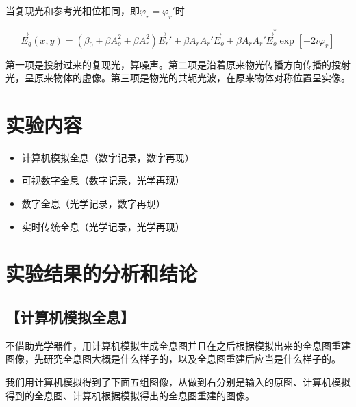 \documentclass{ctexart}
\let\oldsubsection\subsection
\renewcommand{\subsection}[1]{\oldsubsection{\!\!\!\!\!\!【#1】}}
\begin{document}
当复现光和参考光相位相同，即$\varphi_r = \varphi_r'$时

\begin{equation}
  \label{eq:复现光参考光相等}
  \vec{E}_g \left( x,y \right) = \left( \beta_0 + \beta A_o^2 + \beta A_r^2 \right) \vec{E}_r'
  + \beta A_r A_r' \vec{E}_o + \beta A_r A_r' \vec{E}_o^{*} \exp \left[ - 2 i \varphi_r \right]
\end{equation}

第一项是投射过来的复现光，算噪声。第二项是沿着原来物光传播方向传播的投射光，呈原来物体的虚像。第三项是物光的共轭光波，在原来物体对称位置呈实像。

\section{实验内容}

\begin{itemize}
\item 计算机模拟全息（数字记录，数字再现）
\item 可视数字全息（数字记录，光学再现）
\item 数字全息（光学记录，数字再现）
\item 实时传统全息（光学记录，光学再现）
\end{itemize}

\section{实验结果的分析和结论}

\subsection{计算机模拟全息}

不借助光学器件，用计算机模拟生成全息图并且在之后根据模拟出来的全息图重建图像，先研究全息图大概是什么样子的，以及全息图重建后应当是什么样子的。

我们用计算机模拟得到了下面五组图像，从做到右分别是输入的原图、计算机模拟得到的全息图、计算机根据模拟得出的全息图重建的图像。
\end{document}
